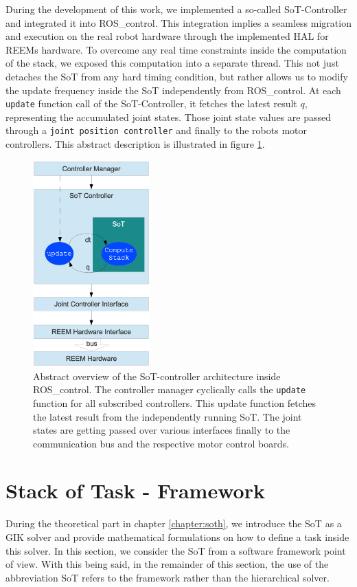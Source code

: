 During the development of this work, we implemented a so-called SoT-Controller and integrated it into ROS\_control. This integration implies a seamless migration and execution on the real robot hardware through the implemented HAL for REEMs hardware.
To overcome any real time constraints inside the computation of the stack, we exposed this computation into a separate thread. This not just detaches the SoT from any hard timing condition, but rather allows us to modify the update frequency inside the SoT independently from ROS\_control. At each \texttt{update} function call of the SoT-Controller, it fetches the latest result $q$, representing the accumulated joint states. Those joint state values are passed through a \texttt{joint position controller} and finally to the robots motor controllers. This abstract description is illustrated in figure \ref{fig:sotcontrol}.
\begin{figure}[h!]
  \centering
    \includegraphics[width=0.4\textwidth]{../figures/sot_controller.eps}
    \caption{Abstract overview of the SoT-controller architecture inside ROS\_control. The controller manager cyclically calls the \texttt{update} function for all subscribed controllers. This update function fetches the latest result from the independently running SoT. The joint states are getting passed over various interfaces finally to the communication bus and the respective motor control boards.}
    \label{fig:sotcontrol}
\end{figure}

\section{Stack of Task - Framework}\label{sec:sotframework}
During the theoretical part in chapter \ref{chapter:soth}, we introduce the SoT as a GIK solver and provide mathematical formulations on how to define a task inside this solver. In this section, we consider the SoT from a software framework point of view. With this being said, in the remainder of this section, the use of the abbreviation SoT refers to the framework rather than the hierarchical solver. 

